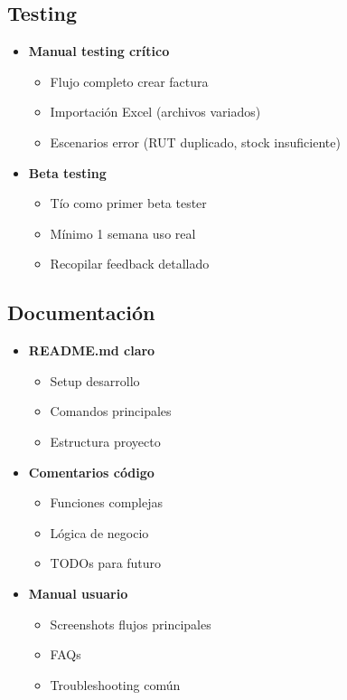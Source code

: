 \documentclass[11pt,a4paper]{article}
\begin{document}
\subsection{Testing}

\begin{itemize}
    \item \textbf{Manual testing crítico}
    \begin{itemize}
        \item Flujo completo crear factura
        \item Importación Excel (archivos variados)
        \item Escenarios error (RUT duplicado, stock insuficiente)
    \end{itemize}
    
    \item \textbf{Beta testing}
    \begin{itemize}
        \item Tío como primer beta tester
        \item Mínimo 1 semana uso real
        \item Recopilar feedback detallado
    \end{itemize}
\end{itemize}

\subsection{Documentación}

\begin{itemize}
    \item \textbf{README.md claro}
    \begin{itemize}
        \item Setup desarrollo
        \item Comandos principales
        \item Estructura proyecto
    \end{itemize}
    
    \item \textbf{Comentarios código}
    \begin{itemize}
        \item Funciones complejas
        \item Lógica de negocio
        \item TODOs para futuro
    \end{itemize}
    
    \item \textbf{Manual usuario}
    \begin{itemize}
        \item Screenshots flujos principales
        \item FAQs
        \item Troubleshooting común
    \end{itemize}
\end{itemize}
\end{document}
